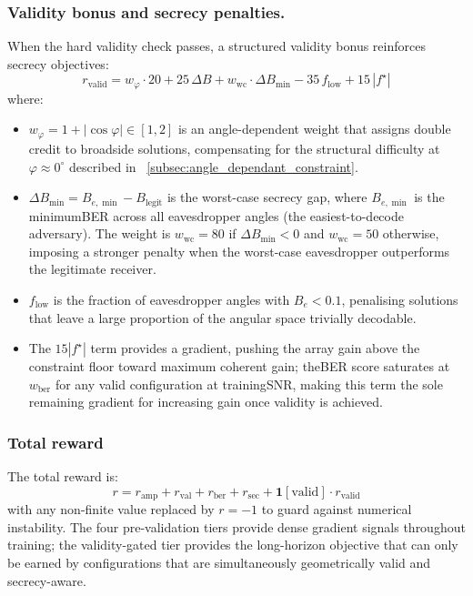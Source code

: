 \subsubsection{Validity bonus and secrecy penalties.}
When the hard validity check passes, a structured validity bonus reinforces secrecy objectives:
\begin{equation}
    r_{\text{valid}} = w_\varphi \cdot 20 + 25\,\Delta B + w_{\text{wc}} \cdot \Delta B_{\min} - 35\,f_{\text{low}} + 15\,|f^\star|
\end{equation}
where:
\begin{itemize}
    \item $w_\varphi = 1 + |\cos\varphi| \in [1, 2]$ is an angle-dependent weight that assigns double credit to broadside solutions, compensating for the structural difficulty at $\varphi \approx 0^\circ$ described in \sectionname~\ref{subsec:angle_dependant_constraint}.
    \item $\Delta B_{\min} = B_{e,\min} - B_{\text{legit}}$ is the worst-case secrecy gap, where $B_{e,\min}$ is the minimum\gls{BER} across all eavesdropper angles (the easiest-to-decode adversary). The weight is $w_{\text{wc}} = 80$ if $\Delta B_{\min} < 0$ and $w_{\text{wc}} = 50$ otherwise, imposing a stronger penalty when the worst-case eavesdropper outperforms the legitimate receiver.
    \item $f_{\text{low}}$ is the fraction of eavesdropper angles with $B_e < 0.1$, penalising solutions that leave a large proportion of the angular space trivially decodable.
    \item The $15|f^\star|$ term provides a gradient, pushing the array gain above the constraint floor toward maximum coherent gain; the\gls{BER} score saturates at $w_{\text{ber}}$ for any valid configuration at training\gls{SNR}, making this term the sole remaining gradient for increasing gain once validity is achieved.
\end{itemize}

\subsubsection{Total reward}
The total reward is:
\begin{equation}
    r = r_{\text{amp}} + r_{\text{val}} + r_{\text{ber}} + r_{\text{sec}} + \mathbf{1}[\text{valid}]\cdot r_{\text{valid}}
\end{equation}
with any non-finite value replaced by $r = -1$ to guard against numerical instability. The four pre-validation tiers provide dense gradient signals throughout training; the validity-gated tier provides the long-horizon objective that can only be earned by configurations that are simultaneously geometrically valid and secrecy-aware.


